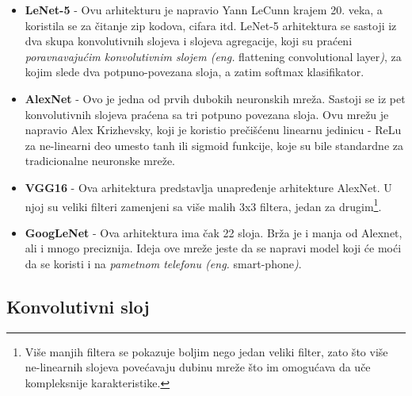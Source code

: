 \documentclass[a4paper]{article}
\begin{document}
\begin{itemize}

\item \textbf{LeNet-5} - Ovu arhitekturu je napravio Yann LeCunn krajem 20. veka, a koristila se za čitanje zip kodova, cifara itd. LeNet-5 arhitektura se sastoji iz dva skupa konvolutivnih slojeva i slojeva agregacije, koji su praćeni \textit{poravnavajućim konvolutivnim slojem (eng.} flattening convolutional layer\textit{)}, za kojim slede dva potpuno-povezana sloja, a zatim softmax klasifikator.

\item \textbf{AlexNet} - Ovo je jedna od prvih dubokih neuronskih mreža. Sastoji se iz pet konvolutivnih slojeva praćena sa tri potpuno povezana sloja. Ovu mrežu je napravio Alex Krizhevsky, koji je koristio prečišćenu linearnu jedinicu - ReLu za ne-linearni deo umesto tanh ili sigmoid funkcije, koje su bile standardne za tradicionalne neuronske mreže.

\item \textbf{VGG16} - Ova arhitektura predstavlja unapređenje arhitekture AlexNet. U njoj su veliki filteri zamenjeni sa više malih 3x3 filtera, jedan za drugim\footnote{Više manjih filtera se pokazuje boljim nego jedan veliki filter, zato što više ne-linearnih slojeva povećavaju dubinu mreže što im omogućava da uče kompleksnije karakteristike.}.


\item \textbf{GoogLeNet} - Ova arhitektura ima čak 22 sloja. Brža je i manja od Alexnet, ali i mnogo preciznija. Ideja ove mreže jeste da se napravi model koji će moći da se koristi i na \textit{pametnom telefonu (eng.} smart-phone\textit{)}.

\end{itemize}


\subsection{Konvolutivni sloj}
\label{konvolucija}
\end{document}

